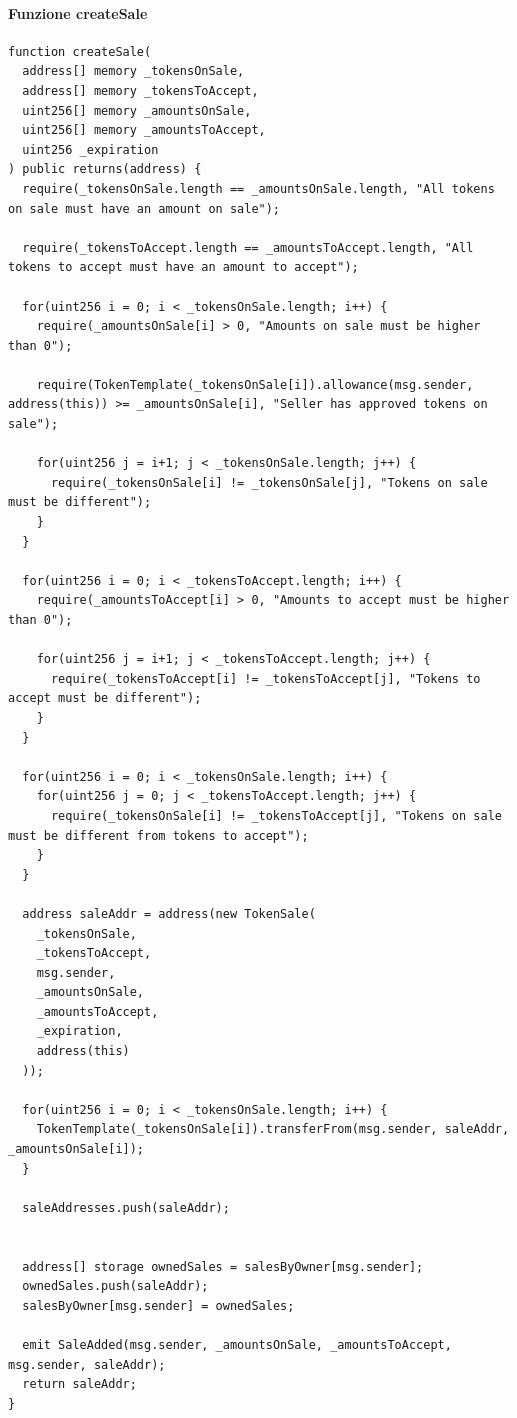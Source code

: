 \documentclass[a4paper]{article}
\begin{document}
        \paragraph{Funzione createSale}
\begin{lstlisting}[style=ES6, title={Funzione createSale()}]
function createSale(
  address[] memory _tokensOnSale,
  address[] memory _tokensToAccept,
  uint256[] memory _amountsOnSale,
  uint256[] memory _amountsToAccept,
  uint256 _expiration
) public returns(address) {
  require(_tokensOnSale.length == _amountsOnSale.length, "All tokens on sale must have an amount on sale");

  require(_tokensToAccept.length == _amountsToAccept.length, "All tokens to accept must have an amount to accept");

  for(uint256 i = 0; i < _tokensOnSale.length; i++) {
    require(_amountsOnSale[i] > 0, "Amounts on sale must be higher than 0");

    require(TokenTemplate(_tokensOnSale[i]).allowance(msg.sender, address(this)) >= _amountsOnSale[i], "Seller has approved tokens on sale");

    for(uint256 j = i+1; j < _tokensOnSale.length; j++) {
      require(_tokensOnSale[i] != _tokensOnSale[j], "Tokens on sale must be different");
    }
  }
  
  for(uint256 i = 0; i < _tokensToAccept.length; i++) {
    require(_amountsToAccept[i] > 0, "Amounts to accept must be higher than 0");

    for(uint256 j = i+1; j < _tokensToAccept.length; j++) {
      require(_tokensToAccept[i] != _tokensToAccept[j], "Tokens to accept must be different");
    }
  }

  for(uint256 i = 0; i < _tokensOnSale.length; i++) {
    for(uint256 j = 0; j < _tokensToAccept.length; j++) {
      require(_tokensOnSale[i] != _tokensToAccept[j], "Tokens on sale must be different from tokens to accept");
    }
  }

  address saleAddr = address(new TokenSale(
    _tokensOnSale,
    _tokensToAccept,
    msg.sender,
    _amountsOnSale,
    _amountsToAccept,
    _expiration,
    address(this)
  ));

  for(uint256 i = 0; i < _tokensOnSale.length; i++) {
    TokenTemplate(_tokensOnSale[i]).transferFrom(msg.sender, saleAddr, _amountsOnSale[i]);
  }

  saleAddresses.push(saleAddr);


  address[] storage ownedSales = salesByOwner[msg.sender];
  ownedSales.push(saleAddr);
  salesByOwner[msg.sender] = ownedSales;

  emit SaleAdded(msg.sender, _amountsOnSale, _amountsToAccept, msg.sender, saleAddr);
  return saleAddr;
}\end{lstlisting}
\end{document}
